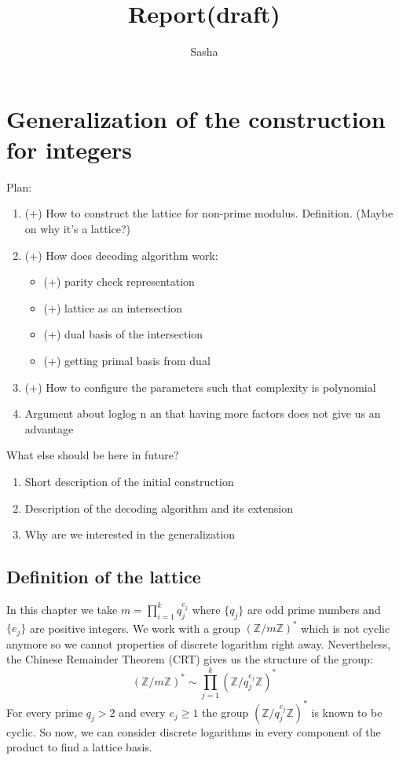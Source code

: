 \documentclass[12pt]{article}
\title{Report(draft)}
\author{ Sasha }
\newcommand{\ZZ}{\mathbb{Z}}
\def\improved{\bgroup \markoverwith{\textcolor{black}{\lower4.5pt\hbox{\sixly \char58}}}\ULon}
\begin{document}
\maketitle

\section{Generalization of the construction for integers}
Plan:
\begin{enumerate}
    \item (+) How to construct the lattice for non-prime modulus. Definition. (Maybe on why it's a lattice?)
    \item (+) How does decoding algorithm work:
    \begin{itemize}
        \item (+) parity check representation
        \item (+) lattice as an intersection
        \item (+) dual basis of the intersection
        \item (+) getting primal basis from dual
    \end{itemize}
    \item (+) How to configure the parameters such that complexity is polynomial
    \item Argument about loglog n an that having more factors does not give us an advantage
\end{enumerate}

What else should be here in future?
\begin{enumerate}
    \item Short description of the initial construction
    \item Description of the decoding algorithm and its extension
    \item Why are we interested in the generalization
\end{enumerate}

\subsection{Definition of the lattice}
In this chapter we take $m = \prod_{i=1}^{k} q_{j}^{e_{j}}$ where $\{q_{j}\}$ are odd prime numbers and $\{e_{j}\}$ are positive integers. We work with a group $(\ZZ/m\ZZ)^*$ which is not cyclic anymore so we cannot \improved{use?} properties of discrete logarithm right away. Nevertheless, the Chinese Remainder Theorem (CRT) gives us the structure of the group:
\begin{equation}
    (\ZZ/m\ZZ)^* \sim \prod_{j=1}^{k}(\ZZ/q_{j}^{e_{j}}\ZZ)^*
\end{equation}
For every prime $q_{j} > 2$ and every $e_{j} \geq 1$ the group $(\ZZ/q_{j}^{e_{j}}\ZZ)^*$ is known to be cyclic. So now, we can consider discrete logarithms in every component of the product to find a lattice basis.
\end{document}
